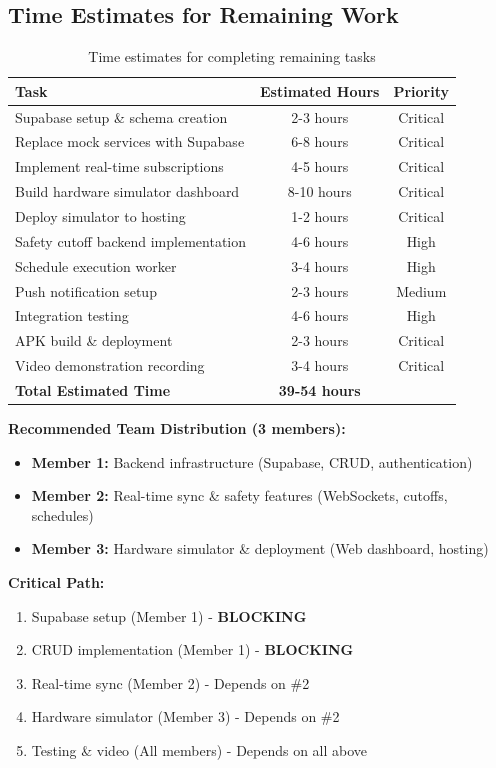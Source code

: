 \documentclass[12pt,a4paper]{article}
\begin{document}
\subsection{Time Estimates for Remaining Work}

\begin{table}[h]
\centering
\begin{tabularx}{\textwidth}{|X|c|c|}
\hline
\textbf{Task} & \textbf{Estimated Hours} & \textbf{Priority} \\
\hline
Supabase setup \& schema creation & 2-3 hours & Critical \\
\hline
Replace mock services with Supabase & 6-8 hours & Critical \\
\hline
Implement real-time subscriptions & 4-5 hours & Critical \\
\hline
Build hardware simulator dashboard & 8-10 hours & Critical \\
\hline
Deploy simulator to hosting & 1-2 hours & Critical \\
\hline
Safety cutoff backend implementation & 4-6 hours & High \\
\hline
Schedule execution worker & 3-4 hours & High \\
\hline
Push notification setup & 2-3 hours & Medium \\
\hline
Integration testing & 4-6 hours & High \\
\hline
APK build \& deployment & 2-3 hours & Critical \\
\hline
Video demonstration recording & 3-4 hours & Critical \\
\hline
\textbf{Total Estimated Time} & \textbf{39-54 hours} & \\
\hline
\end{tabularx}
\caption{Time estimates for completing remaining tasks}
\end{table}

\textbf{Recommended Team Distribution (3 members):}
\begin{itemize}
    \item \textbf{Member 1:} Backend infrastructure (Supabase, CRUD, authentication)
    \item \textbf{Member 2:} Real-time sync \& safety features (WebSockets, cutoffs, schedules)
    \item \textbf{Member 3:} Hardware simulator \& deployment (Web dashboard, hosting)
\end{itemize}

\textbf{Critical Path:}
\begin{enumerate}
    \item Supabase setup (Member 1) - \textbf{BLOCKING}
    \item CRUD implementation (Member 1) - \textbf{BLOCKING}
    \item Real-time sync (Member 2) - Depends on \#2
    \item Hardware simulator (Member 3) - Depends on \#2
    \item Testing \& video (All members) - Depends on all above
\end{enumerate}
\end{document}
